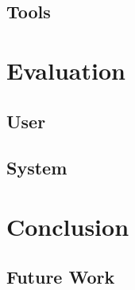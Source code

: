 \documentclass{l4proj}
\begin{document}
\section{Tools}


\chapter{Evaluation}
\section{User}
\section{System}

\chapter{Conclusion}
\section{Future Work}
\section{}


\end{document}
